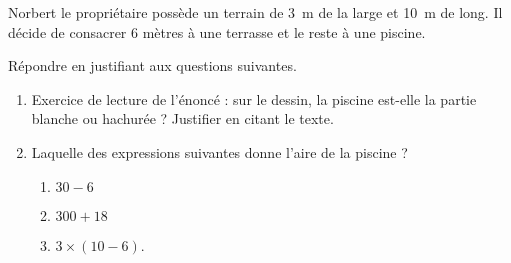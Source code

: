 
\begin{exercice}\label{exosmath-0976}

    Norbert le propriétaire possède un terrain de \SI{3}{\meter} de la large et \SI{10}{\meter} de long. Il décide de consacrer \( 6\) mètres à une terrasse et le reste à une piscine. 

\begin{center}
   
\end{center}

Répondre en justifiant aux questions suivantes.
\begin{enumerate}
    \item
        Exercice de lecture de l'énoncé : sur le dessin, la piscine est-elle la partie blanche ou hachurée ? Justifier en citant le texte.
    \item
        Laquelle des expressions suivantes donne l'aire de la piscine ?
        \begin{enumerate}
            \item
                \( 30-6\)
            \item
                \( 300+18\)
            \item
                \( 3\times (10-6)\).
        \end{enumerate}
\end{enumerate}

\end{exercice}
